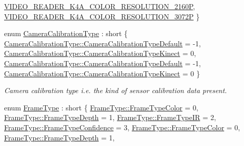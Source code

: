 \begin{DoxyCompactItemize}
\hyperlink{namespacemoetsi_1_1ssp_a012fc4787d5a6d3ddfca72b606360919ad4b9f7eb63c6babf8ad3ddff9f071a64}{V\+I\+D\+E\+O\+\_\+\+R\+E\+A\+D\+E\+R\+\_\+\+K4\+A\+\_\+\+C\+O\+L\+O\+R\+\_\+\+R\+E\+S\+O\+L\+U\+T\+I\+O\+N\+\_\+2160P}, 
\hyperlink{namespacemoetsi_1_1ssp_a012fc4787d5a6d3ddfca72b606360919a309b563d4eb03fe407ab99359558b4f0}{V\+I\+D\+E\+O\+\_\+\+R\+E\+A\+D\+E\+R\+\_\+\+K4\+A\+\_\+\+C\+O\+L\+O\+R\+\_\+\+R\+E\+S\+O\+L\+U\+T\+I\+O\+N\+\_\+3072P}
 \}
\item 
enum \hyperlink{namespacemoetsi_1_1ssp_a1f51291db51233dc5865d42e6ee36ef8}{Camera\+Calibration\+Type} \+: short \{ \hyperlink{namespacemoetsi_1_1ssp_a1f51291db51233dc5865d42e6ee36ef8ac32f0bb1b309dd3992d8e37bfaa00c78}{Camera\+Calibration\+Type\+::\+Camera\+Calibration\+Type\+Default} = -\/1, 
\hyperlink{namespacemoetsi_1_1ssp_a1f51291db51233dc5865d42e6ee36ef8a662285f55328b6f7305456b86b8056bb}{Camera\+Calibration\+Type\+::\+Camera\+Calibration\+Type\+Kinect} = 0, 
\hyperlink{namespacemoetsi_1_1ssp_a1f51291db51233dc5865d42e6ee36ef8ac32f0bb1b309dd3992d8e37bfaa00c78}{Camera\+Calibration\+Type\+::\+Camera\+Calibration\+Type\+Default} = -\/1, 
\hyperlink{namespacemoetsi_1_1ssp_a1f51291db51233dc5865d42e6ee36ef8a662285f55328b6f7305456b86b8056bb}{Camera\+Calibration\+Type\+::\+Camera\+Calibration\+Type\+Kinect} = 0
 \}\begin{DoxyCompactList}\small\item\em Camera calibration type i.\+e. the kind of sensor calibration data present. \end{DoxyCompactList}
\item 
enum \hyperlink{namespacemoetsi_1_1ssp_a46efdfa2cd5a28ead465dcc8006b5a87}{Frame\+Type} \+: short \{ \newline
\hyperlink{namespacemoetsi_1_1ssp_a46efdfa2cd5a28ead465dcc8006b5a87ad039a5ecd3504edc955b88006db4ba21}{Frame\+Type\+::\+Frame\+Type\+Color} = 0, 
\hyperlink{namespacemoetsi_1_1ssp_a46efdfa2cd5a28ead465dcc8006b5a87a59cea6d94577d85ef8e142036e047064}{Frame\+Type\+::\+Frame\+Type\+Depth} = 1, 
\hyperlink{namespacemoetsi_1_1ssp_a46efdfa2cd5a28ead465dcc8006b5a87a2c799f7416882b538fa8295567f65cf5}{Frame\+Type\+::\+Frame\+Type\+IR} = 2, 
\hyperlink{namespacemoetsi_1_1ssp_a46efdfa2cd5a28ead465dcc8006b5a87a1b85b2c60b857778932e29e0e5021ba1}{Frame\+Type\+::\+Frame\+Type\+Confidence} = 3, 
\newline
\hyperlink{namespacemoetsi_1_1ssp_a46efdfa2cd5a28ead465dcc8006b5a87ad039a5ecd3504edc955b88006db4ba21}{Frame\+Type\+::\+Frame\+Type\+Color} = 0, 
\hyperlink{namespacemoetsi_1_1ssp_a46efdfa2cd5a28ead465dcc8006b5a87a59cea6d94577d85ef8e142036e047064}{Frame\+Type\+::\+Frame\+Type\+Depth} = 1, 

\end{DoxyCompactItemize}
